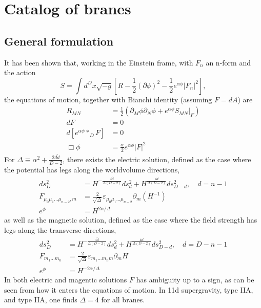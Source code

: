 \section{Catalog of branes}

\subsection{General formulation}
\label{sec:general brane solns}
It has been shown \cite{Stelle:1998xg} that, working in the Einstein frame, with $F_n$ an n-form and the action
\begin{equation}
S = \int d^Dx\sqrt{-g}\left[
    R - \frac{1}{2}(\partial\phi)^2 - \frac{1}{2}e^{\alpha\phi}|F_n|^2
\right],
\end{equation}
the equations of motion, together with Bianchi identity (assuming $F = dA$) are
\begin{align}
R_{MN} 
&= \frac{1}{2}\left(
    \partial_M\phi\partial_N\phi + e^{\alpha\phi}S_{MN}\big|_F
\right)\\
dF&=0\\
d[e^{\alpha\phi}*_D F] &=0\\
\Box\phi&=\frac{\alpha}{2}e^{\alpha\phi}|F|^2
\end{align} 
For $\Delta\equiv \alpha^2 +\frac{2 d \tilde{d}}{D-2}$, there exists the electric solution, defined as the case where the potential has legs along the worldvolume directions,
\begin{align}
ds_D^2
&=H^{-\frac{4\tilde d}{\Delta(D-2)}}ds_{d}^2+
H^{\frac{4d}{\Delta(D-2)}}ds_{D-d}^2,\quad
d = n-1\\
F_{\mu_0\mu_1...\mu_{n-2},m}
&=\frac{2}{\sqrt\Delta}\varepsilon_{\mu_0\mu_1...\mu_{n-2}}\partial_m (H^{-1})\\
e^\phi
&=H^{2\alpha/\Delta}
\end{align}
as well as the magnetic solution, defined as the case where the field strength has legs along the transverse directions,
\begin{align}
ds_D^2
&=H^{-\frac{4\tilde d}{\Delta(D-2)}}ds_{d}^2+
H^{\frac{4d}{\Delta(D-2)}}ds_{D-d}^2,\quad
d = D-n-1\\
F_{m_1...m_n}
&= \frac{2}{\sqrt{\Delta}}\varepsilon_{m_1...m_n m}\partial_m H\\
e^\phi &= H^{-2\alpha/\Delta}
\end{align}
In both electric and magentic solutions $F$ has ambiguity up to a sign, as can be seen from how it enters the equations of motion.
In 11d supergravity, type IIA, and type IIA, one finds $\Delta = 4$ for all branes.


